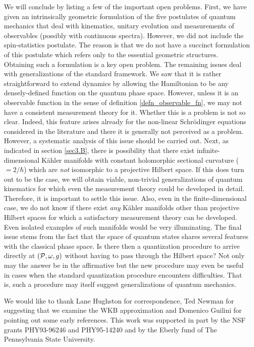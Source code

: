 \documentclass[12pt,aps,eqsecnum,tighten]{revtex4-2}
\def\P{{\cal P}}
\def\w{\omega}
\begin{document}
We will conclude by listing a few of the important open problems.
First, we have given an intrinsically geometric formulation of the
five postulates of quantum mechanics that deal with kinematics,
unitary evolution and measurements of observables (possibly with
continuous spectra). However, we did not include the spin-statistics
postulate. The reason is that we do not have a succinct formulation of
this postulate which refers only to the essential geometric
structures. Obtaining such a formulation is a key open problem. The
remaining issues deal with generalizations of the standard
framework. We saw that it is rather straightforward to extend dynamics
by allowing the Hamiltonian to be any densely-defined function on the
quantum phase space. However, unless it is an observable function in
the sense of definition \ref{defn_observable_fn}, we may not have a
consistent measurement theory for it.  Whether this is a problem is
not so clear. Indeed, this feature arises already for the non-linear
Schr\"odinger equations considered in the literature and there it is
generally not perceived as a problem.  However, a systematic analysis
of this issue should be carried out. Next, as indicated in section
\ref{sec3.B}, there is possibility that there exist
infinite-dimensional K\"ahler manifolds with constant holomorphic
sectional curvature ($=2/\hbar$) which are {\it not} isomorphic to a
projective Hilbert space. If this does turn out to be the case, we
will obtain viable, non-trivial generalizations of quantum kinematics
for which even the measurement theory could be developed in
detail. Therefore, it is important to settle this issue. Also, even in
the finite-dimensional case, we do not know if there exist {\it any}
K\"ahler manifolds other than projective Hilbert spaces for which a
satisfactory measurement theory can be developed.  Even isolated
examples of such manifolds would be very illuminating. The final issue
stems from the fact that the space of quantum states shares several
features with the classical phase space. Is there then a quantization
procedure to arrive directly at $(\P, \w, g)$ without having to pass
through the Hilbert space? Not only may the answer be in the
affirmative but the new procedure may even be useful in cases when the
standard quantization procedure encounters difficulties. That is, such
a procedure may itself suggest generalizations of quantum mechanics.


\acknowledgements
\vskip20pt
We would like to thank Lane Hughston for correspondence, Ted Newman
for suggesting that we examine the WKB approximation and Domenico
Guilini for pointing out some early references.  This work was
supported in part by the NSF grants PHY93-96246 and PHY95-14240 and by
the Eberly fund of The Pennsylvania State University.
\end{document}
